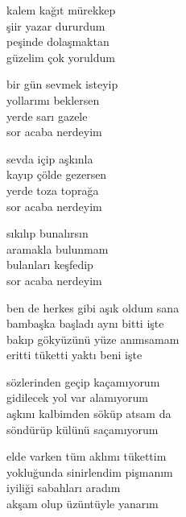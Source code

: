 \documentclass[10pt, openright, oneside]{memoir}
\theoremstyle{definition}
\begin{document}
\vspace*{\fill}
%
\newpage
{}
\vspace*{\fill}
\settowidth{\versewidth}{kalem kağıt mürekkep}
\begin{cverse}
  kalem kağıt mürekkep \\
  şiir yazar dururdum \\
  peşinde dolaşmaktan \\
  güzelim çok yoruldum
\end{cverse}
\vspace*{\fill}
%
\newpage
{}
\vspace*{\fill}
\settowidth{\versewidth}{bir gün sevmek isteyip}
\begin{cverse}
  bir gün sevmek isteyip \\
  yollarımı beklersen \\
  yerde sarı gazele \\
  sor acaba nerdeyim

  sevda içip aşkınla \\
  kayıp çölde gezersen \\
  yerde toza toprağa \\
  sor acaba nerdeyim

  sıkılıp bunalırsın \\
  aramakla bulunmam \\
  bulanları keşfedip \\
  sor acaba nerdeyim
\end{cverse}
\vspace*{\fill}
%
\newpage
{}
\vspace*{\fill}
\settowidth{\versewidth}{ben de herkes gibi aşık oldum sana}
\begin{cverse}
  ben de herkes gibi aşık oldum sana \\
  bambaşka başladı aynı bitti işte \\
  bakıp gökyüzünü yüze anımsamam \\
  eritti tüketti yaktı beni işte

  sözlerinden geçip kaçamıyorum \\
  gidilecek yol var alamıyorum \\
  aşkını kalbimden söküp atsam da \\
  söndürüp külünü saçamıyorum
\end{cverse}
\vspace*{\fill}
%
\newpage
{}
\vspace*{\fill}
\settowidth{\versewidth}{elde varken tüm aklımı tükettim}
\begin{cverse}
  elde varken tüm aklımı tükettim \\
  yokluğunda sinirlendim pişmanım \\
  iyiliği sabahları aradım \\
  akşam olup üzüntüyle yanarım
\end{cverse}
\vspace*{\fill}
%
\newpage
\end{document}
